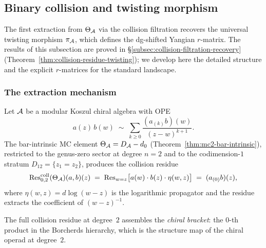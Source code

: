 \subsection{Binary collision and twisting morphism}
\label{subsec:thqg-V-binary-collision}

The first extraction from $\Theta_{\mathcal{A}}$ via the collision filtration
recovers the universal twisting morphism $\pi_{\mathcal{A}}$, which defines
the dg-shifted Yangian $r$-matrix. The results of this subsection
are proved in
\S\ref{subsec:collision-filtration-recovery}
(Theorem~\ref{thm:collision-residue-twisting}); we develop here
the detailed structure and the explicit $r$-matrices for the
standard landscape.


\subsubsection{The extraction mechanism}

\begin{construction}
\label{constr:thqg-V-binary-extraction}
Let $\mathcal{A}$ be a modular Koszul chiral algebra with OPE
\begin{equation}\label{eq:thqg-V-ope}
a(z)\, b(w)
\;\sim\;
\sum_{k \geq 0}
\frac{(a_{(k)}b)(w)}{(z - w)^{k+1}}.
\end{equation}
The bar-intrinsic MC element $\Theta_{\mathcal{A}} = D_{\mathcal{A}} - d_0$
(Theorem~\ref{thm:mc2-bar-intrinsic}), restricted to the genus-zero
sector at degree $n = 2$ and to the codimension-$1$ stratum
$D_{12} = \{z_1 = z_2\}$, produces the collision residue
\begin{equation}\label{eq:thqg-V-binary-residue}
\operatorname{Res}^{\mathrm{coll}}_{0,2}(\Theta_{\mathcal{A}})(a, b)(z)
\;=\;
\operatorname{Res}_{w = z}
\bigl[
 a(w) \cdot b(z) \cdot \eta(w,z)
\bigr]
\;=\;
(a_{(0)}b)(z),
\end{equation}
where $\eta(w,z) = d\log(w - z)$ is the logarithmic propagator and
the residue extracts the coefficient of $(w - z)^{-1}$.

The full collision residue at degree~$2$ assembles the \emph{chiral
bracket}: the $0$-th product in the Borcherds hierarchy, which is the
structure map of the chiral operad at degree~$2$.
\end{construction}

